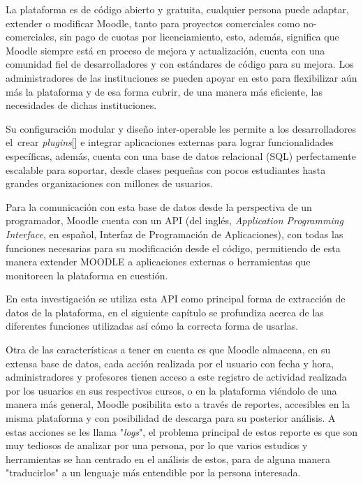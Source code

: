 La plataforma es de código abierto y gratuita, cualquier persona puede adaptar, extender o modificar Moodle, tanto para proyectos comerciales como no-comerciales, sin pago de cuotas por licenciamiento, esto, además, significa que Moodle siempre está en proceso de mejora y actualización, cuenta con una comunidad fiel de desarrolladores y con estándares de código para su mejora. Los administradores de las instituciones se pueden apoyar en esto para flexibilizar aún más la plataforma y de esa forma cubrir, de una manera más eficiente, las necesidades de dichas instituciones.  


Su configuración modular y diseño inter-operable les permite a los desarrolladores el crear \textit{plugins}[\cite{Moodle_Plugins}] e integrar aplicaciones externas para lograr funcionalidades específicas, además, cuenta con una base de datos relacional (SQL) perfectamente escalable para soportar, desde clases pequeñas con pocos estudiantes hasta grandes organizaciones con millones de usuarios.  


Para la comunicación con esta base de datos desde la perspectiva de un programador, Moodle cuenta con un API (del inglés, \textit{Application Programming Interface}, en español, Interfaz de Programación de Aplicaciones), con todas las funciones necesarias para su modificación desde el código, permitiendo de esta manera extender MOODLE a aplicaciones externas o herramientas que monitoreen la plataforma en cuestión.  


En esta investigación se utiliza esta API como principal forma de extracción de datos de la plataforma, en el siguiente capítulo se profundiza acerca de las diferentes funciones utilizadas así cómo la correcta forma de usarlas.  


Otra de las características a tener en cuenta es que Moodle almacena, en su extensa base de datos, cada acción realizada por el usuario con fecha y hora, administradores y profesores tienen acceso a este registro de actividad realizada por los usuarios en sus respectivos cursos, o en la plataforma viéndolo de una manera más general, Moodle posibilita esto a través de reportes, accesibles en la misma plataforma y con posibilidad de descarga para su posterior análisis. A estas acciones se les llama "\textit{logs}", el problema principal de estos reporte es que son muy tediosos de analizar por una persona, por lo que varios estudios y herramientas se han centrado en el análisis de estos, para de alguna manera "traducirlos" a un lenguaje más entendible por la persona interesada.

